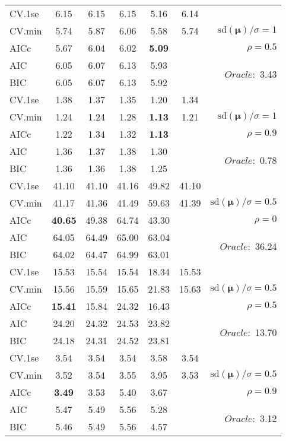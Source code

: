 \begin{table}
\begin{center}
\begin{tabular}{l*{5}{c}|r}
 \hline 
CV.1se & 6.15 & 6.15 & 6.15 & 5.16 & 6.14 & \\
CV.min & 5.74 & 5.87 & 6.06 & 5.58 & 5.74 &  $\mathrm{sd}(\mathbf{\mu})/\sigma=1$ \\
AICc & 5.67 & 6.04 & 6.02 & {\bf 5.09} & & $\rho=0.5$ \\
AIC & 6.05 & 6.07 & 6.13 & 5.93 & &  \multirow{2}{*}{$Oracle: $ 3.43} \\
BIC & 6.05 & 6.07 & 6.13 & 5.92 & &  \\
 \hline 
CV.1se & 1.38 & 1.37 & 1.35 & 1.20 & 1.34 & \\
CV.min & 1.24 & 1.24 & 1.28 & {\bf 1.13} & 1.21 &  $\mathrm{sd}(\mathbf{\mu})/\sigma=1$ \\
AICc & 1.22 & 1.34 & 1.32 & {\bf 1.13} & & $\rho=0.9$ \\
AIC & 1.36 & 1.37 & 1.38 & 1.30 & &  \multirow{2}{*}{$Oracle: $ 0.78} \\
BIC & 1.36 & 1.36 & 1.38 & 1.25 & &  \\
 \hline 
CV.1se & 41.10 & 41.10 & 41.16 & 49.82 & 41.10 & \\
CV.min & 41.17 & 41.36 & 41.49 & 59.63 & 41.39 &  $\mathrm{sd}(\mathbf{\mu})/\sigma=0.5$ \\
AICc & {\bf 40.65} & 49.38 & 64.74 & 43.30 & & $\rho=0$ \\
AIC & 64.05 & 64.49 & 65.00 & 63.04 & &  \multirow{2}{*}{$Oracle: $ 36.24} \\
BIC & 64.02 & 64.47 & 64.99 & 63.01 & &  \\
 \hline 
CV.1se & 15.53 & 15.54 & 15.54 & 18.34 & 15.53 & \\
CV.min & 15.56 & 15.59 & 15.65 & 21.83 & 15.63 &  $\mathrm{sd}(\mathbf{\mu})/\sigma=0.5$ \\
AICc & {\bf 15.41} & 15.84 & 24.32 & 16.43 & & $\rho=0.5$ \\
AIC & 24.20 & 24.32 & 24.53 & 23.82 & &  \multirow{2}{*}{$Oracle: $ 13.70} \\
BIC & 24.18 & 24.31 & 24.52 & 23.81 & &  \\
 \hline 
CV.1se & 3.54 & 3.54 & 3.54 & 3.58 & 3.54 & \\
CV.min & 3.52 & 3.54 & 3.55 & 3.95 & 3.53 &  $\mathrm{sd}(\mathbf{\mu})/\sigma=0.5$ \\
AICc & {\bf 3.49} & 3.53 & 5.40 & 3.67 & & $\rho=0.9$ \\
AIC & 5.47 & 5.49 & 5.56 & 5.28 & &  \multirow{2}{*}{$Oracle: $ 3.12} \\
BIC & 5.46 & 5.49 & 5.56 & 4.57 & &  \\
 \hline 
\end{tabular}
\end{center}
\vspace{-1cm}
\end{table}




